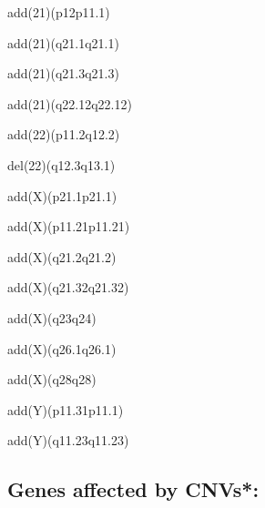 \documentclass[]{article}
\begin{document}
add(21)(p12p11.1)

add(21)(q21.1q21.1)

add(21)(q21.3q21.3)

add(21)(q22.12q22.12)

add(22)(p11.2q12.2)

del(22)(q12.3q13.1)

add(X)(p21.1p21.1)

add(X)(p11.21p11.21)

add(X)(q21.2q21.2)

add(X)(q21.32q21.32)

add(X)(q23q24)

add(X)(q26.1q26.1)

add(X)(q28q28)

add(Y)(p11.31p11.1)

add(Y)(q11.23q11.23)

\hypertarget{genes-affected-by-cnvs}{%
\subsection{Genes affected by CNVs*:}\label{genes-affected-by-cnvs}}
\end{document}
